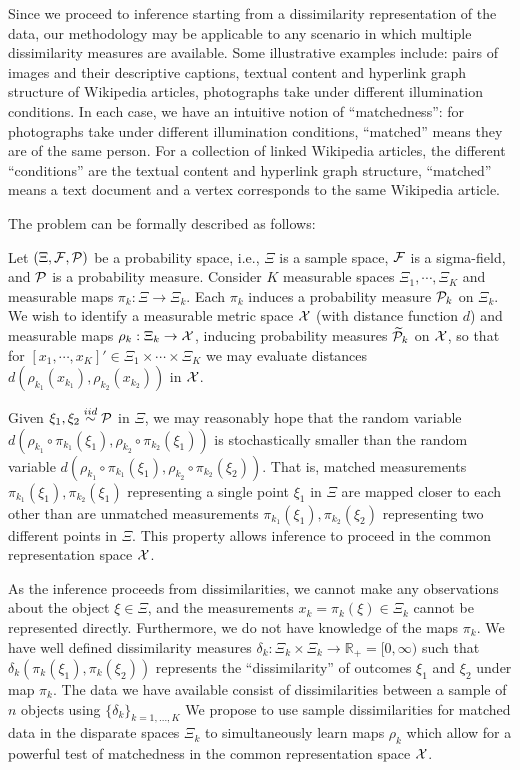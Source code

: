 \documentclass[12pt,oneside,final]{thesis}\usepackage[]{graphicx}\usepackage[]{color}
\begin{document}
		Since we proceed to inference starting from a dissimilarity representation of the data, our methodology may be applicable to any scenario in which multiple dissimilarity measures are available.  Some illustrative examples include:  pairs of images and their descriptive captions,  textual content  and  hyperlink graph
structure of  Wikipedia  articles, photographs take under different illumination conditions. In each case, we have an intuitive notion of ``matchedness'': for photographs take under different illumination conditions, ``matched'' means they are of the same person. For a collection of linked Wikipedia articles, the different ``conditions''  are  the textual content and hyperlink graph structure, ``matched'' means a text document and  a vertex  corresponds to the same Wikipedia article. 

 
The problem can be formally described as follows:


Let $(\Xi,\mathcal{F},\mathcal{P})$ be a probability space,
i.e., $\Xi$ is a sample space, $\mathcal{F}$ is a sigma-field,
and $\mathcal{P}$ is a probability measure.
Consider $K$ measurable spaces $\Xi_1,\cdots,\Xi_K$ 
and measurable maps $\pi_k:\Xi \to \Xi_k$.
Each $\pi_k$ induces a probability measure $\mathcal{P}_k$ on $\Xi_k$.
We wish to identify a measurable metric space $\mathcal{X}$
(with distance function $d$)
and measurable maps $\rho_k: \Xi_k \to \mathcal{X}$,
inducing probability measures $\widetilde{\mathcal{P}}_k$ on $\mathcal{X}$,
so that for $[x_1,\cdots,x_K]' \in \Xi_1 \times \cdots \times \Xi_K$
we may evaluate distances $d(\rho_{k_1}(x_{k_1}),\rho_{k_2}(x_{k_2}))$ in $\mathcal{X}$.


Given $\xi_1,\xi_2 \stackrel{iid}{\sim} \mathcal{P}$ in $\Xi$,
we may reasonably hope that the random variable
$d(\rho_{k_1}\circ\pi_{k_1}(\xi_1),\rho_{k_2}\circ\pi_{k_2}(\xi_1))$
is stochastically smaller than the random variable
$d(\rho_{k_1}\circ\pi_{k_1}(\xi_1),\rho_{k_2}\circ\pi_{k_2}(\xi_2))$.
That is, matched measurements 
$\pi_{k_1}(\xi_1),\pi_{k_2}(\xi_1)$
representing a single point $\xi_1$ in $\Xi$
are mapped closer to each other than are
unmatched measurements 
$\pi_{k_1}(\xi_1),\pi_{k_2}(\xi_2)$
representing two different points in $\Xi$.
This property allows inference to proceed in the common representation space $\mathcal{X}$.


As the inference proceeds from dissimilarities, we cannot make any observations about the object
 $\xi \in \Xi$,  and the measurements $x_k = \pi_k(\xi) \in \Xi_k$ cannot be represented directly. Furthermore, we do not have knowledge of the maps $\pi_k$.
 We have well defined dissimilarity measures
$\delta_k:\Xi_k \times \Xi_k \to \mathbb{R}_+ = [0,\infty)$
such that $\delta_k( \pi_k(\xi_1) , \pi_k(\xi_2) )$
represents the ``dissimilarity'' of outcomes $\xi_1$ and $\xi_2$
under map $\pi_k$.
The data we have  available consist of dissimilarities between a sample of $n$ objects using $\{\delta_k\}_{k=1,\ldots,K}$
We propose to use sample dissimilarities for matched data in the disparate spaces $\Xi_k$
to simultaneously learn maps $\rho_k$ which allow for a powerful test of matchedness
in the common representation space $\mathcal{X}$.
\end{document}
